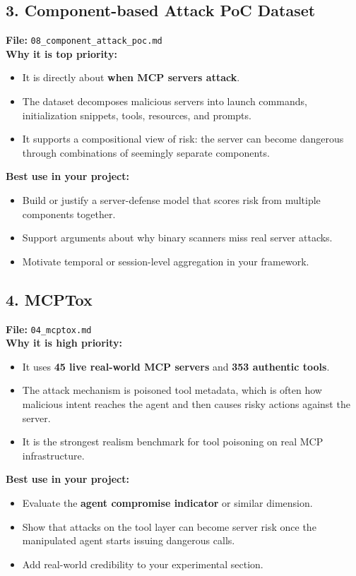 \documentclass[11pt]{article}
\begin{document}
\subsection*{3. Component-based Attack PoC Dataset}
\textbf{File:} \texttt{08\_component\_attack\_poc.md} \\
\textbf{Why it is top priority:}
\begin{itemize}[leftmargin=1.2em]
\item It is directly about \textbf{when MCP servers attack}.
\item The dataset decomposes malicious servers into launch commands, initialization snippets, tools, resources, and prompts.
\item It supports a compositional view of risk: the server can become dangerous through combinations of seemingly separate components.
\end{itemize}
\textbf{Best use in your project:}
\begin{itemize}[leftmargin=1.2em]
\item Build or justify a server-defense model that scores risk from multiple components together.
\item Support arguments about why binary scanners miss real server attacks.
\item Motivate temporal or session-level aggregation in your framework.
\end{itemize}

\subsection*{4. MCPTox}
\textbf{File:} \texttt{04\_mcptox.md} \\
\textbf{Why it is high priority:}
\begin{itemize}[leftmargin=1.2em]
\item It uses \textbf{45 live real-world MCP servers} and \textbf{353 authentic tools}.
\item The attack mechanism is poisoned tool metadata, which is often how malicious intent reaches the agent and then causes risky actions against the server.
\item It is the strongest realism benchmark for tool poisoning on real MCP infrastructure.
\end{itemize}
\textbf{Best use in your project:}
\begin{itemize}[leftmargin=1.2em]
\item Evaluate the \textbf{agent compromise indicator} or similar dimension.
\item Show that attacks on the tool layer can become server risk once the manipulated agent starts issuing dangerous calls.
\item Add real-world credibility to your experimental section.
\end{itemize}
\end{document}
